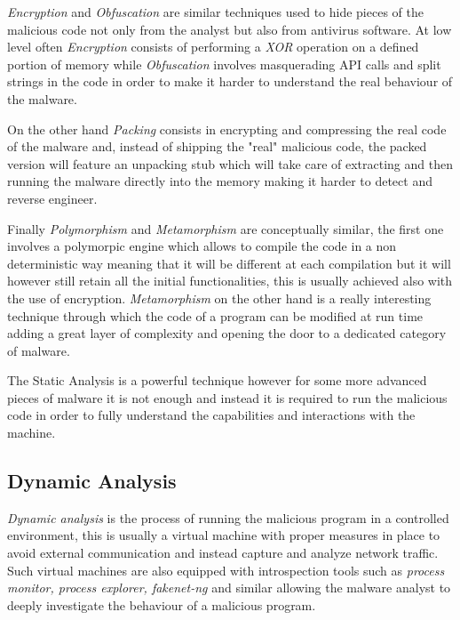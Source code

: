 \textit{Encryption} and \textit{Obfuscation} are similar techniques used to hide pieces of the malicious code not only from the analyst but also from antivirus software. At low level often \textit{Encryption} consists of performing a \textit{XOR} operation on a defined portion of memory while \textit{Obfuscation} involves masquerading API calls and split strings in the code in order to make it harder to understand the real behaviour of the malware.

On the other hand \textit{Packing} consists in encrypting and compressing the real code of the malware and, instead of shipping the "real" malicious code, the packed version will feature an unpacking stub which will take care of extracting and then running the malware directly into the memory making it harder to detect and reverse engineer.

Finally \textit{Polymorphism} and \textit{Metamorphism} are conceptually similar, the first one involves a polymorpic engine which allows to compile the code in a non deterministic way meaning that it will be different at each compilation but it will however still retain all the initial functionalities, this is usually achieved also with the use of encryption. \textit{Metamorphism} on the other hand is a really interesting technique through which the code of a program can be modified at run time adding a great layer of complexity and opening the door to a dedicated category of malware.

The Static Analysis is a powerful technique however for some more advanced pieces of malware it is not enough and instead it is required to run the malicious code in order to fully understand the capabilities and interactions with the machine.

\subsection*{Dynamic Analysis}


\textit{Dynamic analysis} is the process of running the malicious program in a controlled environment, this is usually a virtual machine with proper measures in place to avoid external communication and instead capture and analyze network traffic. Such virtual machines are also equipped with introspection tools such as \textit{process monitor, process explorer, fakenet-ng} and similar allowing the malware analyst to deeply investigate the behaviour of a malicious program.

